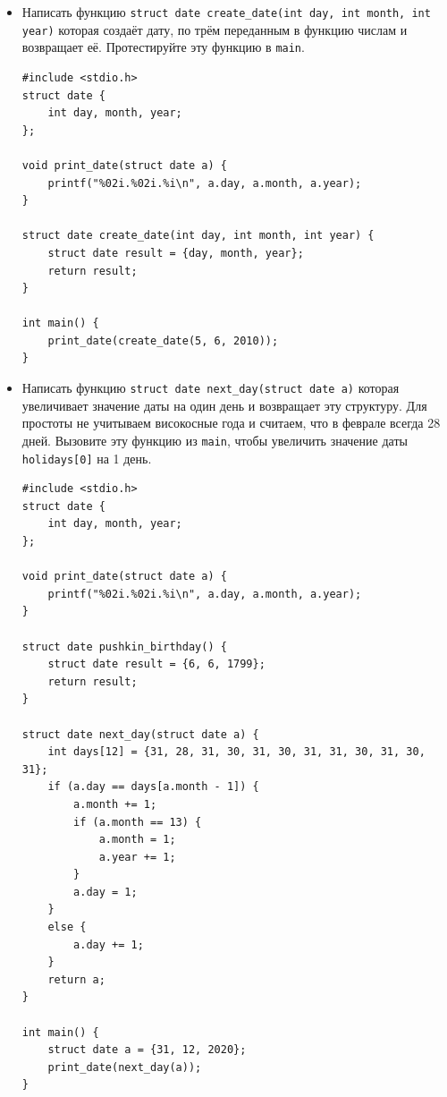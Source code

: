 \documentclass{article}
\begin{document}
\begin{itemize}
\item Написать функцию \texttt{struct date create\_date(int day, int month, int year)} которая создаёт дату, по трём переданным в функцию числам  и возвращает её. Протестируйте эту функцию в \texttt{main}.

\begin{lstlisting}[backgroundcolor = \color{solcolor}]
#include <stdio.h>
struct date {
    int day, month, year;
};

void print_date(struct date a) {
    printf("%02i.%02i.%i\n", a.day, a.month, a.year);
}

struct date create_date(int day, int month, int year) {
    struct date result = {day, month, year};
    return result;
}

int main() {
    print_date(create_date(5, 6, 2010));
}
\end{lstlisting}


\newpage
\item Написать функцию \texttt{struct date next\_day(struct date a)} которая увеличивает значение даты на один день и возвращает эту структуру. Для простоты не учитываем високосные года и считаем, что в феврале всегда 28 дней. Вызовите эту функцию из \texttt{main}, чтобы увеличить значение даты \texttt{holidays[0]} на 1 день.

\begin{lstlisting}[backgroundcolor = \color{solcolor}]
#include <stdio.h>
struct date {
    int day, month, year;
};

void print_date(struct date a) {
    printf("%02i.%02i.%i\n", a.day, a.month, a.year);
}

struct date pushkin_birthday() {
    struct date result = {6, 6, 1799};
    return result;
}

struct date next_day(struct date a) {
    int days[12] = {31, 28, 31, 30, 31, 30, 31, 31, 30, 31, 30, 31};
    if (a.day == days[a.month - 1]) {
        a.month += 1;
        if (a.month == 13) {
            a.month = 1;
            a.year += 1;
        }
        a.day = 1;
    }
    else {
        a.day += 1;
    }
    return a;
}

int main() {
    struct date a = {31, 12, 2020};
    print_date(next_day(a));
}
\end{lstlisting}
\end{itemize}
\newpage
\end{document}
